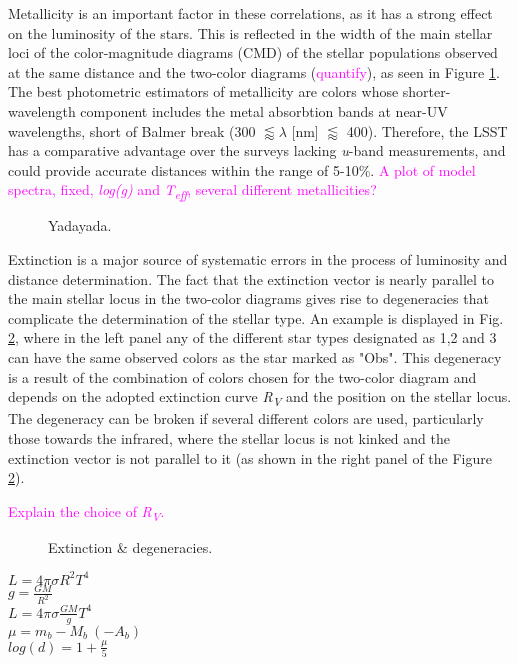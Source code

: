 \documentclass[linenumbers, twocolumn, trackchanges]{aastex631}
\newcommand{\magcom}[1]{\textcolor{magenta}{#1}} %
\newcommand{\RV}{\textit{R\textsubscript{V}}\xspace}
\begin{document}
Metallicity is an important factor in these correlations, as it has a strong effect on the luminosity of the stars. This is reflected in the width of the main stellar loci of the color-magnitude diagrams (CMD) of the stellar populations observed at the same distance and the two-color diagrams (\magcom{quantify}), as seen in Figure \ref{fig:metallicity}. The best photometric estimators of metallicity are colors whose shorter-wavelength component includes the metal absorbtion bands at near-UV wavelengths, short of Balmer break (300 $\lessapprox\lambda$ [nm] $\lessapprox$ 400). Therefore, the LSST has a comparative advantage over the surveys lacking \textit{u}-band measurements, and could provide accurate distances within the range of 5-10\%. \magcom{A plot of model spectra, fixed, \textit{log(g)} and \textit{T\textsubscript{eff}}, several different metallicities?}

\begin{figure}[ht!]
	\caption{Yadayada. \label{fig:metallicity}}
\end{figure}

Extinction is a major source of systematic errors in the process of luminosity and distance determination. The fact that the extinction vector is nearly parallel to the main stellar locus in the two-color diagrams gives rise to degeneracies that complicate the determination of the stellar type. An example is displayed in Fig. \ref{fig:degeneracies}, where in the left panel any of the different star types designated as 1,2 and 3 can have the same observed colors as the star marked as "Obs". This degeneracy is a result of the combination of colors chosen for the two-color diagram and depends on the adopted extinction curve \textit{R\textsubscript{V}} and the position on the stellar locus. The degeneracy can be broken if several different colors are used, particularly those towards the infrared, where the stellar locus is not kinked and the extinction vector is not parallel to it (as shown in the right panel of the Figure \ref{fig:degeneracies}).

\magcom{Explain the choice of \RV.}

\begin{figure}[ht!]
	\caption{Extinction \& degeneracies. \label{fig:degeneracies}}
\end{figure}

$L=4\pi\sigma R^2 T^4$\\
$g = \frac{GM}{R^2}$\\
$L=4\pi \sigma \frac{GM}{g} T^4$\\
$\mu = m_b - M_b {\ }(- A_b)$\\
$log(d) = 1 + \frac{\mu}{5}$\\
\end{document}
